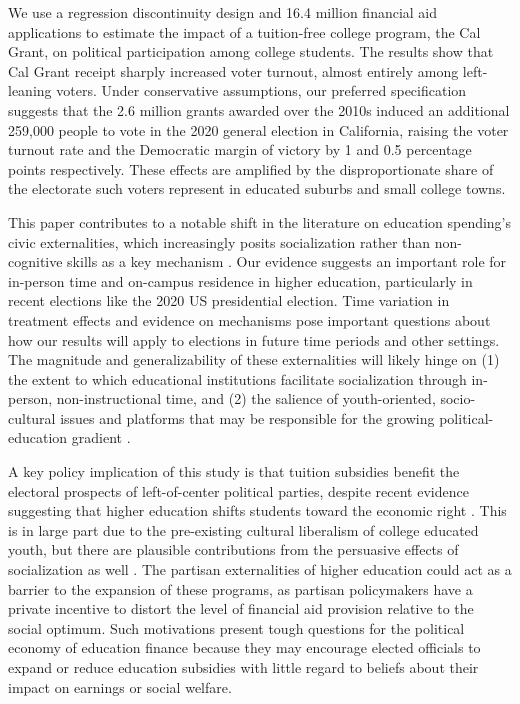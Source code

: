 \documentclass[12pt,letterpaper,oneside]{book}
\begin{document}
We use a regression discontinuity design and 16.4 million financial aid applications to estimate the impact of a tuition-free college program, the Cal Grant, on political participation among college students. The results show that Cal Grant receipt sharply increased voter turnout, almost entirely among left-leaning voters. Under conservative assumptions, our preferred specification suggests that the 2.6 million grants awarded over the 2010s induced an additional 259,000 people to vote in the 2020 general election in California, raising the voter turnout rate and the Democratic margin of victory by 1 and 0.5 percentage points respectively. These effects are amplified by the disproportionate share of the electorate such voters represent in educated suburbs and small college towns.

This paper contributes to a notable shift in the literature on education spending's civic externalities, which increasingly posits socialization rather than non-cognitive skills as a key mechanism \citep{persson_education_2015,mendelberg_college_2017}. Our evidence suggests an important role for in-person time and on-campus residence in higher education, particularly in recent elections like the 2020 US presidential election. Time variation in treatment effects and evidence on mechanisms pose important questions about how our results will apply to  elections in future time periods and other settings. The magnitude and generalizability of these externalities will likely hinge on (1) the extent to which educational institutions facilitate socialization through in-person, non-instructional time, and (2) the salience of youth-oriented, socio-cultural issues and platforms that may be responsible for the growing political-education gradient \citep{krishna_poor_2008,gethin_political_2021}.

A key policy implication of this study is that tuition subsidies benefit the electoral prospects of left-of-center political parties, despite recent evidence suggesting that higher education shifts students toward the economic right \citep{mendelberg_college_2017,scott_does_2022}. This is in large part due to the pre-existing cultural liberalism of college educated youth, but there are plausible contributions from the persuasive effects of socialization as well \citep{apfeld_higher_2022,firoozi_effect_2023}. The partisan externalities of higher education could act as a barrier to the expansion of these programs, as partisan policymakers have a private incentive to distort the level of financial aid provision relative to the social optimum. Such motivations present tough questions for the political economy of education finance because they may encourage elected officials to expand or reduce education subsidies with little regard to beliefs about their impact on earnings or social welfare.
\end{document}
